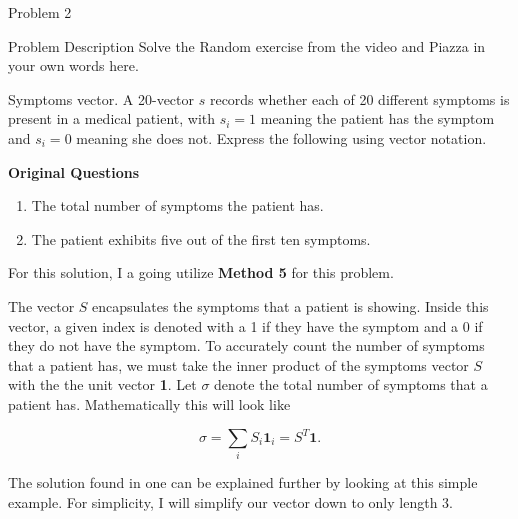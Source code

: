 \begin{problem}{Problem 2}
    \begin{statement}{Problem Description}
        Solve the Random exercise from the video and Piazza in your own words here. \vspace*{1em}

        Symptoms vector. A 20-vector $s$ records whether each of 20 different symptoms is present in a medical patient, with $s_i = 1$ meaning the patient has the symptom and $s_i = 0$ meaning she does not. Express the following 
        using vector notation. \vspace*{1em}

        \textbf{Original Questions}

        \begin{enumerate}[label=(\alph*)]
            \item The total number of symptoms the patient has.
            \item The patient exhibits five out of the first ten symptoms.
        \end{enumerate}
    \end{statement}

    \begin{highlight}
        For this solution, I a going utilize \textbf{Method 5} for this problem. \vspace*{1em}

        The vector $S$ encapsulates the symptoms that a patient is showing. Inside this vector, a given index is denoted with a 1 if they have the symptom and a 0 if they do not have the symptom. To accurately count the number of
        symptoms that a patient has, we must take the inner product of the symptoms vector $S$ with the the unit vector \textbf{1}. Let $\sigma$ denote the total number of symptoms that a patient has. Mathematically this will look like

        \setcounter{equation}{0}
        \begin{equation}
            \sigma = \sum_{i} S_{i}\mathbf{1}_{i} = S^{T}\mathbf{1}.
        \end{equation}

        The solution found in one can be explained further by looking at this simple example. For simplicity, I will simplify our vector down to only length 3.


\end{highlight}
\end{problem}
